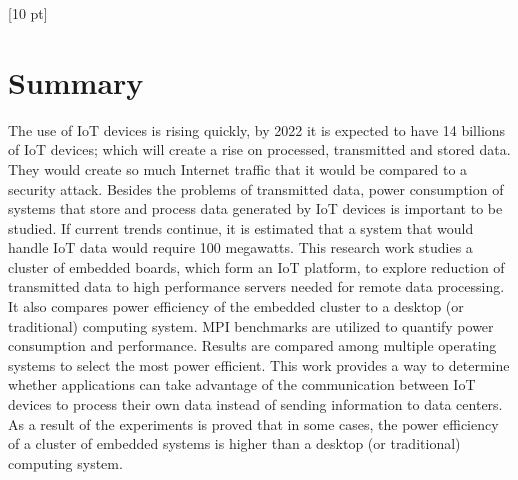 \titleformat{\chapter}{\Huge\bfseries}{\thechapter}{0 pt}{\rule{340 pt}{3 pt}\\}
\titlespacing{\chapter}{100 pt}{-25 pt}{40 pt}[10 pt]	
\pagestyle{fancy}
\fancyhead[RO,RE]{\thepage}
\fancyfoot[CO,CE]{}

\chapter*{Summary}


\normalsize
\noindent 

The use of IoT devices is rising quickly, by 2022 it is expected to have 14
billions of IoT devices; which will create a rise on processed, transmitted and
stored data.  They would create so much Internet traffic that it would be
compared to a security attack. Besides the problems of transmitted data, power
consumption of systems that store and process data generated by IoT devices is
important to be studied. If current trends continue, it is estimated that a
system that would handle IoT data would require 100 megawatts. This research
work studies a cluster of embedded boards, which form an IoT platform, to
explore reduction of transmitted data to high performance servers needed for
remote data processing. It also compares power efficiency of the embedded
cluster to a desktop (or traditional) computing system. MPI benchmarks are
utilized to quantify power consumption and performance.  Results are compared
among multiple operating systems to select the most power efficient. This work
provides a way to determine whether applications can take advantage of the
communication between IoT devices to process their own data instead of sending
information to data centers. As a result of the experiments is proved that in
some cases, the power efficiency of a cluster of embedded systems is higher
than a desktop (or traditional) computing system.

\clearpage
